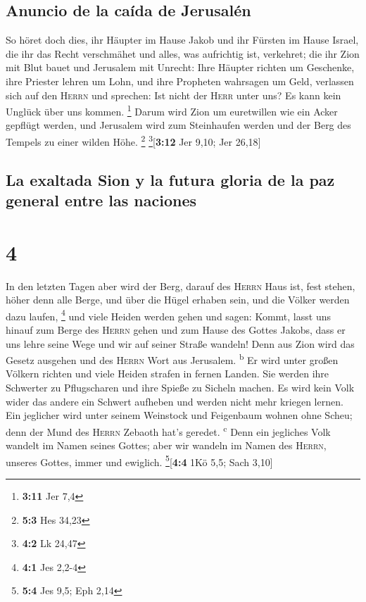 \hypertarget{anuncio-de-la-cauxedda-de-jerusaluxe9n}{%
\subsection{Anuncio de la caída de
Jerusalén}\label{anuncio-de-la-cauxedda-de-jerusaluxe9n}}

 So höret doch dies, ihr Häupter im Hause Jakob und ihr
Fürsten im Hause Israel, die ihr das Recht verschmähet und alles, was
aufrichtig ist, verkehret;  die ihr Zion mit Blut bauet
und Jerusalem mit Unrecht:  Ihre Häupter richten um
Geschenke, ihre Priester lehren um Lohn, und ihre Propheten wahrsagen um
Geld, verlassen sich auf den \textsc{Herrn} und sprechen: Ist nicht der
\textsc{Herr} unter uns? Es kann kein Unglück über uns kommen.
\footnote{\textbf{3:11} Jer 7,4}  Darum wird Zion um
euretwillen wie ein Acker gepflügt werden, und Jerusalem wird zum
Steinhaufen werden und der Berg des Tempels zu einer wilden Höhe.
\footnote{\textbf{5:3} Hes 34,23} \footnote{\textbf{4:2} Lk 24,47}{[}\textbf{3:12}
Jer 9,10; Jer 26,18{]}

\hypertarget{la-exaltada-sion-y-la-futura-gloria-de-la-paz-general-entre-las-naciones}{%
\subsection{La exaltada Sion y la futura gloria de la paz general entre
las
naciones}\label{la-exaltada-sion-y-la-futura-gloria-de-la-paz-general-entre-las-naciones}}

\hypertarget{section-3}{%
\section{4}\label{section-3}}

 In den letzten Tagen aber wird der Berg, darauf des
\textsc{Herrn} Haus ist, fest stehen, höher denn alle Berge, und über
die Hügel erhaben sein, und die Völker werden dazu laufen, \footnote{\textbf{4:1}
  Jes 2,2-4}  und viele Heiden werden gehen und sagen:
Kommt, lasst uns hinauf zum Berge des \textsc{Herrn} gehen und zum Hause
des Gottes Jakobs, dass er uns lehre seine Wege und wir auf seiner
Straße wandeln! Denn aus Zion wird das Gesetz ausgehen und des
\textsc{Herrn} Wort aus Jerusalem. \textsuperscript{b}  Er
wird unter großen Völkern richten und viele Heiden strafen in fernen
Landen. Sie werden ihre Schwerter zu Pflugscharen und ihre Spieße zu
Sicheln machen. Es wird kein Volk wider das andere ein Schwert aufheben
und werden nicht mehr kriegen lernen.  Ein jeglicher wird
unter seinem Weinstock und Feigenbaum wohnen ohne Scheu; denn der Mund
des \textsc{Herrn} Zebaoth hat's geredet. \textsuperscript{c}
 Denn ein jegliches Volk wandelt im Namen seines Gottes;
aber wir wandeln im Namen des \textsc{Herrn}, unseres Gottes, immer und
ewiglich. \footnote{\textbf{5:4} Jes 9,5; Eph 2,14}{[}\textbf{4:4} 1Kö
5,5; Sach 3,10{]}

